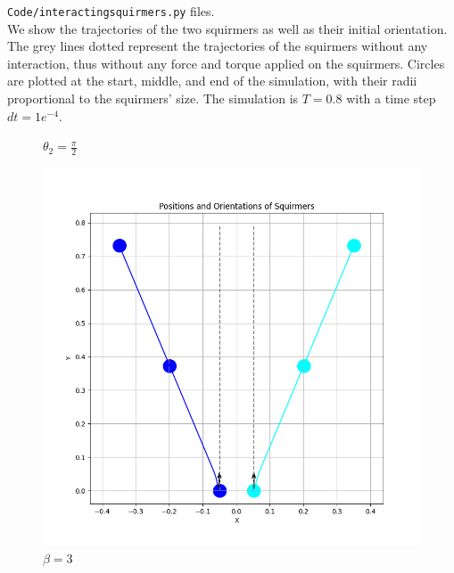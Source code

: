 \documentclass{article}
\begin{document}
 \texttt{Code/interactingsquirmers.py} files.\\
 We show the trajectories of the two squirmers as well as their initial orientation. The grey lines dotted
 represent the trajectories of the squirmers without any interaction, thus without any 
 force and torque applied on the squirmers. Circles are plotted at the start, 
 middle, and end of the simulation, with their radii proportional to the squirmers' size. The simulation is $T=0.8$
 with a time step $dt=1e^{-4}$.
 \begin{figure}[H]
    \centering
    \textbf{$\theta_2 = \frac{\pi}{2}$}\par\medskip
    \begin{minipage}{0.49\textwidth}
        \includegraphics[width=1.1\textwidth]{graphs/simulations/sim_sq_sq/beta3/pi_2_.png}
        \caption{\footnotesize $\beta = 3$}
    \end{minipage}\hfill
    \begin{minipage}{0.49\textwidth}

\end{minipage}
\end{figure}
\end{document}
